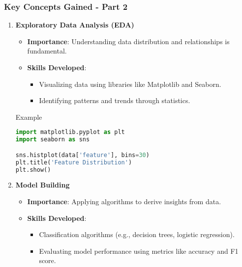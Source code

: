 \documentclass[aspectratio=169]{beamer}
\begin{document}
\begin{frame}[fragile]
    \frametitle{Key Concepts Gained - Part 2}
    \begin{enumerate}[resume]
        \item \textbf{Exploratory Data Analysis (EDA)}
        \begin{itemize}
            \item \textbf{Importance}: Understanding data distribution and relationships is fundamental.
            \item \textbf{Skills Developed}:
            \begin{itemize}
                \item Visualizing data using libraries like Matplotlib and Seaborn.
                \item Identifying patterns and trends through statistics.
            \end{itemize}
        \end{itemize}
        \begin{block}{Example}
        \begin{lstlisting}[language=Python]
import matplotlib.pyplot as plt
import seaborn as sns

sns.histplot(data['feature'], bins=30)
plt.title('Feature Distribution')
plt.show()
        \end{lstlisting}
        \end{block}
        \item \textbf{Model Building}
        \begin{itemize}
            \item \textbf{Importance}: Applying algorithms to derive insights from data.
            \item \textbf{Skills Developed}:
            \begin{itemize}
                \item Classification algorithms (e.g., decision trees, logistic regression).
                \item Evaluating model performance using metrics like accuracy and F1 score.
            \end{itemize}
        \end{itemize}
    \end{enumerate}
\end{frame}
\end{document}
